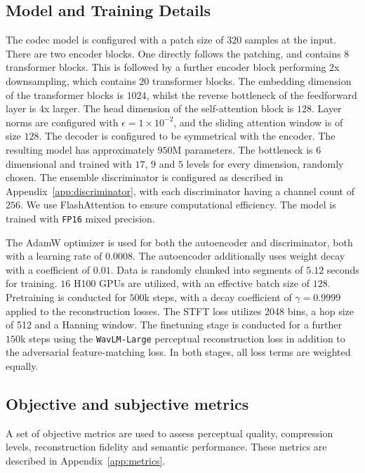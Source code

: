 \documentclass{article} %
\begin{document}
\subsection{Model and Training Details}
The codec model is configured with a patch size of $320$ samples at the input. There are two encoder blocks. One directly follows the patching, and contains $8$ transformer blocks. This is followed by a further encoder block performing $2$x downsampling, which contains $20$ transformer blocks. The embedding dimension of the transformer blocks is $1024$, whilst the reverse bottleneck of the feedforward layer is $4$x larger. The head dimension of the self-attention block is $128$. Layer norms are configured with $\epsilon = 1\times10^{-2}$, and the sliding attention window is of size $128$. The decoder is configured to be symmetrical with the encoder. The resulting model has approximately $950$M parameters. 
The bottleneck is $6$ dimensional and trained with $17$, $9$ and $5$ levels for every dimension, randomly chosen. The ensemble discriminator is configured as described in Appendix~\ref{app:discriminator}, with each discriminator having a channel count of $256$. We use FlashAttention \citep{dao2022flashattention} to ensure computational efficiency. The model is trained with \texttt{FP16} mixed precision.

The AdamW optimizer is used for both the autoencoder and discriminator, both with a learning rate of $0.0008$. The autoencoder additionally uses weight decay with a coefficient of $0.01$. Data is randomly chunked into segments of $5.12$ seconds for training. $16$ H100 GPUs are utilized, with an effective batch size of $128$. Pretraining is conducted for $500$k steps, with a decay coefficient of $\gamma = 0.9999$ applied to the reconstruction losses. The STFT loss utilizes 2048 bins, a hop size of 512 and a Hanning window. The finetuning stage is conducted for a further $150$k steps using the \texttt{WavLM-Large} perceptual reconstruction loss in addition to the adversarial feature-matching loss. In both stages, all loss terms are weighted equally.

\subsection{Objective and subjective metrics}
A set of objective metrics are used to assess perceptual quality, compression levels, reconstruction fidelity and semantic performance. These metrics are described in Appendix~\ref{app:metrics}.
\end{document}
